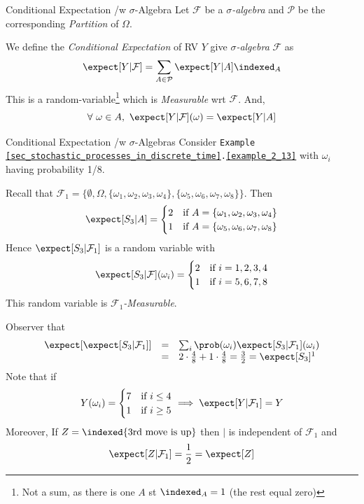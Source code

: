 \documentclass[11pt,a4paper]{article}
\begin{document}
  \begin{definition}{Conditional Expectation /w $\sigma$-Algebra}
    Let $\mathcal{F}$ be a \textit{$\sigma$-algebra} and $\mathcal{P}$ be the corresponding \textit{Partition} of $\Omega$.
    \par We define the \textit{Conditional Expectation} of RV $Y$ give \textit{$\sigma$-algebra} $\mathcal{F}$ as
    \[ \expect[Y|\mathcal{F}]=\sum_{A\in\mathcal{P}}\expect[Y|A]\indexed_A \]
    This is a random-variable\footnote{Not a sum, as there is one $A$ st $\indexed_A=1$ (the rest equal zero)} which is \textit{Measurable} wrt $\mathcal{F}$. And,
    \[ \forall\ \omega\in A,\ \expect[Y|\mathcal{F}](\omega)=\expect[Y|A] \]
  \end{definition}

  \begin{example}{Conditional Expectation /w $\sigma$-Algebras}
    Consider \texttt{Example \ref{sec_stochastic_processes_in_discrete_time}.\ref{example_2_13}} with $\omega_i$ having probability 1/8.
    \par Recall that $\mathcal{F}_1=\big\{\emptyset,\Omega,\{\omega_1,\omega_2,\omega_3,\omega_4\},\{\omega_5,\omega_6,\omega_7,\omega_8\}\big\}$.
    Then
    \[ \expect[S_3|A]=\begin{cases}2&\text{if }A=\{\omega_1,\omega_2,\omega_3,\omega_4\}\\1&\text{if }A=\{\omega_5,\omega_6,\omega_7,\omega_8\}\end{cases} \]
    Hence $\expect[S_3|\mathcal{F}_1]$ is a random variable with
    \[ \expect[S_3|\mathcal{F}](\omega_i)=\begin{cases}2&\text{if }i=1,2,3,4\\1&\text{if }i=5,6,7,8\end{cases} \]
    This random variable is \textit{$\mathcal{F}_1$-Measurable}.
    \par Observer that
    \[\begin{array}{rcl}
      \expect[\expect[S_3|\mathcal{F}_1]]&=&\sum_i\prob(\omega_i)\expect[S_3|\mathcal{F}_1](\omega_i)\\
      &=&2\cdot\frac48+1\cdot\frac48=\frac32=\expect[S_3]\footnotemark
    \end{array}\]
    Note that if
    \[ Y(\omega_i)=\begin{cases}7&\text{if }i\leq4\\1&\text{if }i\geq5\end{cases}\implies\expect[Y|\mathcal{F}_1]=Y \]
    Moreover, If $Z=\indexed\{\text{3rd move is up}\}$ then $|$ is independent of $\mathcal{F}_1$ and
    \[ \expect[Z|\mathcal{F}_1]=\frac12=\expect[Z] \]
  \end{example}
\end{document}
